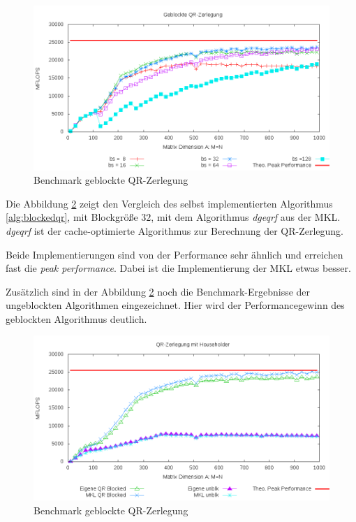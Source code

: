 \begin{figure}[H]
	\includegraphics[width=\textwidth]{images/blkbs.png}
	\caption{Benchmark geblockte QR-Zerlegung}
	\label{img:blkbs}
\end{figure}
\newpage

Die Abbildung \ref{img:blk} zeigt den Vergleich des selbst implementierten Algorithmus \ref{alg:blockedqr}, mit Blockgröße $32$, mit dem Algorithmus  \textit{dgeqrf} aus der MKL.
\textit{dgeqrf} ist der cache-optimierte Algorithmus zur Berechnung der QR-Zerlegung.

Beide Implementierungen sind von der Performance sehr ähnlich und erreichen fast die \textit{peak performance}. Dabei ist die Implementierung der MKL etwas besser.

Zusätzlich sind in der Abbildung \ref{img:blk} noch die Benchmark-Ergebnisse der ungeblockten Algorithmen eingezeichnet. Hier wird der Performancegewinn des geblockten Algorithmus deutlich.

\begin{figure}[H]
  \includegraphics[width=\textwidth]{images/both.png}
  \caption{Benchmark geblockte QR-Zerlegung}
  \label{img:blk}
\end{figure}


